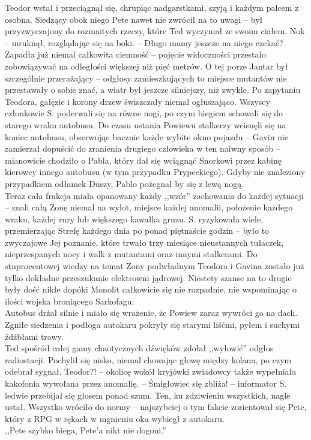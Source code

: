 \documentclass[../MAIN.tex]{subfiles}
\begin{document}
Teodor wstał i przeciągnął się, chrupiąc nadgarstkami, szyją i każdym palcem z osobna. Siedzący obok niego Pete nawet nie zwrócił na to uwagi -- był przyzwyczajony do rozmaitych rzeczy, które Ted wyczyniał ze swoim ciałem.
\sx No\3k -- mruknął, rozglądając się na boki. -- Długo mamy jeszcze na niego czekać?
\qd
Zapadła już niemal całkowita ciemność -- pojęcie widoczności przestało zobowiązywać na odległości większej niż pięć metrów. O tej porze Jantar był szczególnie przerażający -- odgłosy zamieszkujących to miejsce mutantów nie przestawały o sobie znać, a wiatr był jeszcze silniejszy, niż zwykle. Po zapytaniu Teodora, gałęzie i korony drzew świszczały niemal ogłuszająco. Wszyscy członkowie S. poderwali się na równe nogi, po czym biegiem schowali się do starego wraku autobusu. Do czasu ustania Powiewu stalkerzy wcisnęli się na koniec autobusu, obserwując bacznie każde wybite okno pojazdu -- Gavin nie zamierzał dopuścić do zranienia drugiego człowieka w ten naiwny sposób -- mianowicie chodziło o Pabla, który dał się wciągnąć Snorkowi przez kabinę kierowcy innego autobusu (w tym przypadku Prypeckiego). Gdyby nie znaleziony przypadkiem odłamek Duszy, Pablo pożegnał by się z lewą nogą.\\
Teraz cała frakcja miała opanowany każdy ,,wzór'' zachowania do każdej sytuacji -- znali całą Zonę niemal na wylot, miejsce każdej anomalii, położenie każdego wraku, każdej rury lub większego kawałka gruzu. S. ryzykowała wiele, przemierzając Strefę każdego dnia po ponad piętnaście godzin -- było to zwyczajowe Jej poznanie, które trwało trzy miesiące nieustannych tułaczek, nieprzespanych nocy i walk z mutantami oraz innymi stalkerami. Do stuprocentowej wiedzy na temat Zony podwładnym Teodora i Gavina zostało już tylko dokładne przeszukanie elektrowni jądrowej. Niestety szanse na to drugie były dość nikłe dopóki Monolit całkowicie się nie rozpadnie, nie wspominając o ilości wojska broniącego Sarkofagu.\\
Autobus drżał silnie i miało się wrażenie, że Powiew zaraz wywróci go na dach. Zgniłe siedzenia i podłoga autokaru pokryły się starymi liśćmi, pyłem i suchymi źdźbłami trawy.\\
Ted spośród całej gamy chaotycznych dźwięków zdołał ,,wyłowić'' odgłos radiostacji. Pochylił się nisko, niemal chowając głowę między kolana, po czym odebrał sygnał.
\sx Teodor?! -- okolicę wokół kryjówki zwiadowcy także wypełniała kakofonia wywołana przez anomalię. -- Śmigłowiec się zbliża! -- informator S. ledwie przebijał się głosem ponad szum.
\qd
Ten, ku zdziwieniu wszystkich, nagle ustał. Wszystko wróciło do normy -- najszybciej o tym fakcie zorientował się Pete, który z RPG w rękach w mgnieniu oka wybiegł z autokaru.\\
,,Pete szybko biega, Pete’a nikt nie dogoni.''
\end{document}
